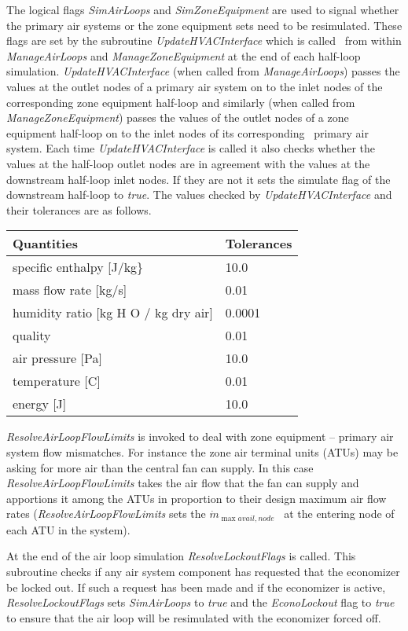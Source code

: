 The logical flags \emph{SimAirLoops} and \emph{SimZoneEquipment} are used to signal whether the primary air systems or the zone equipment sets need to be resimulated. These flags are set by the subroutine \emph{UpdateHVACInterface} which is called~ from within \emph{ManageAirLoops} and \emph{ManageZoneEquipment} at the end of each half-loop simulation. \emph{UpdateHVACInterface} (when called from \emph{ManageAirLoops}) passes the values at the outlet nodes of a primary air system on to the inlet nodes of the corresponding zone equipment half-loop and similarly (when called from \emph{ManageZoneEquipment}) passes the values of the outlet nodes of a zone equipment half-loop on to the inlet nodes of its corresponding~ primary air system. Each time \emph{UpdateHVACInterface} is called it also checks whether the values at the half-loop outlet nodes are in agreement with the values at the downstream half-loop inlet nodes. If they are not it sets the simulate flag of the downstream half-loop to \emph{true}. The values checked by \emph{UpdateHVACInterface} and their tolerances are as follows.

\begin{longtable}[c]{@{}ll@{}}
\toprule 
Quantities & Tolerances \tabularnewline \midrule
\endhead
specific enthalpy [J/kg\} & 10.0 \tabularnewline
mass flow rate [kg/s] & 0.01 \tabularnewline
humidity ratio [kg H  O / kg dry air] & 0.0001 \tabularnewline
quality & 0.01 \tabularnewline
air pressure [Pa] & 10.0 \tabularnewline
temperature [C] & 0.01 \tabularnewline
energy [J] & 10.0 \tabularnewline
\bottomrule
\end{longtable}

\emph{ResolveAirLoopFlowLimits} is invoked to deal with zone equipment -- primary air system flow mismatches. For instance the zone air terminal units (ATUs) may be asking for more air than the central fan can supply. In this case \emph{ResolveAirLoopFlowLimits} takes the air flow that the fan can supply and apportions it among the ATUs in proportion to their design maximum air flow rates (\emph{ResolveAirLoopFlowLimits} sets the \({\dot m_{\max avail,node}}\) ~at the entering node of each ATU in the system).

At the end of the air loop simulation \emph{ResolveLockoutFlags} is called. This subroutine checks if any air system component has requested that the economizer be locked out. If such a request has been made and if the economizer is active, \emph{ResolveLockoutFlags} sets \emph{SimAirLoops} to \emph{true} and the \emph{EconoLockout} flag to \emph{true} to ensure that the air loop will be resimulated with the economizer forced off.
